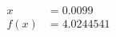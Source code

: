 \documentclass[preview]{standalone}
\begin{document}
\begin{align*}
x &= 0.0099\\f(x) &= 4.0244541
\end{align*}
\end{document}
